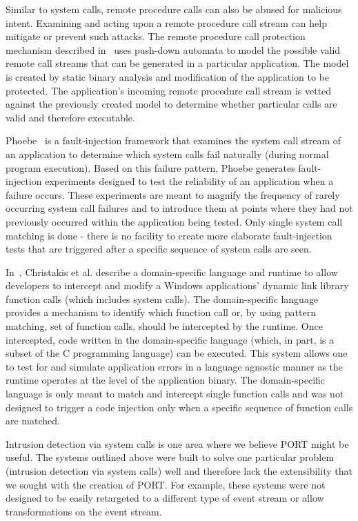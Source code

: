 Similar to system calls, remote procedure calls can also be abused for malicious intent.
Examining and acting upon a remote procedure call stream can help mitigate or prevent such attacks.
The remote procedure call protection mechanism described in~\cite{DBLP:conf/uss/GiffinJM02} uses push-down automata to model the possible valid remote call streams that can be generated in a particular application.
The model is created by static binary analysis and modification of the application to be protected.
The application's incoming remote procedure call stream is vetted against the previously created model to determine whether particular calls are valid and therefore executable.

Phoebe~\cite{DBLP:journals/corr/abs-2006-04444} is a fault-injection framework that examines
the system call stream of an application to determine which system calls fail
naturally (during normal program execution). Based on this failure pattern,
Phoebe generates fault-injection experiments designed to test the reliability of
an application when a failure occurs. These experiments are meant to magnify the
frequency of rarely occurring system call failures and to introduce them at
points where they had not previously occurred within the application being
tested. Only single system call matching is done - there is no facility to create
more elaborate fault-injection tests that are triggered after a specific
sequence of system calls are seen.

In~\cite{DBLP:conf/icse/ChristakisEG017}, Christakis et al. describe a domain-specific language and runtime to allow developers to intercept and modify a Windows applications’ dynamic link library function calls (which includes system calls). The domain-specific language provides a mechanism to identify which function call or, by using pattern matching, set of function calls, should be intercepted by the runtime. Once intercepted, code written in the domain-specific language (which, in part, is a subset of the C programming language) can be executed. This system allows one to test for and simulate application errors in a language agnostic manner as the runtime operates at the level of the application binary. The domain-specific language is only meant to match and intercept single function calls and was not designed to trigger a code injection only when a specific sequence of function calls are matched.

Intrusion detection via system calls is one area where we believe PORT might be useful.  
The systems outlined above were built to solve one particular problem (intrusion detection via system calls) well and
therefore lack the extensibility that we sought with the creation of PORT.
For example, these systems were not designed to be easily retargeted
to a different type of event stream or allow transformations on the event stream.


